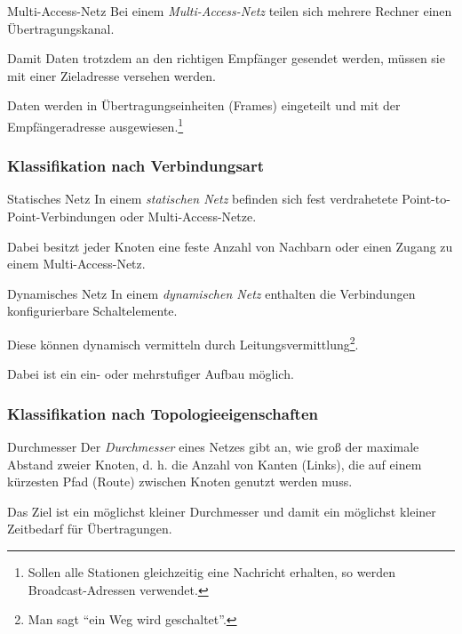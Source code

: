 \begin{defi}{Multi-Access-Netz}
    Bei einem \emph{Multi-Access-Netz} teilen sich mehrere Rechner einen Übertragungskanal.

    Damit Daten trotzdem an den richtigen Empfänger gesendet werden, müssen sie mit einer Zieladresse versehen werden.

    Daten werden in Übertragungseinheiten (Frames) eingeteilt und mit der Empfängeradresse ausgewiesen.\footnote{Sollen alle Stationen gleichzeitig eine Nachricht erhalten, so werden Broadcast-Adressen verwendet.}
\end{defi}

\subsubsection{Klassifikation nach Verbindungsart}

\begin{defi}{Statisches Netz}
    In einem \emph{statischen Netz} befinden sich fest verdrahetete Point-to-Point-Verbindungen oder Multi-Access-Netze.

    Dabei besitzt jeder Knoten eine feste Anzahl von Nachbarn oder einen Zugang zu einem Multi-Access-Netz.
\end{defi}

\begin{defi}{Dynamisches Netz}
    In einem \emph{dynamischen Netz} enthalten die Verbindungen konfigurierbare Schaltelemente.

    Diese können dynamisch vermitteln durch Leitungsvermittlung\footnote{Man sagt \enquote{ein Weg wird geschaltet}.}.

    Dabei ist ein ein- oder mehrstufiger Aufbau möglich.
\end{defi}

\subsubsection{Klassifikation nach Topologieeigenschaften}

\begin{defi}{Durchmesser}
    Der \emph{Durchmesser} eines Netzes gibt an, wie groß der maximale Abstand zweier Knoten, d. h. die Anzahl von Kanten (Links), die auf einem kürzesten Pfad (Route) zwischen Knoten genutzt werden muss.

    Das Ziel ist ein möglichst kleiner Durchmesser und damit ein möglichst kleiner Zeitbedarf für Übertragungen.
\end{defi}

